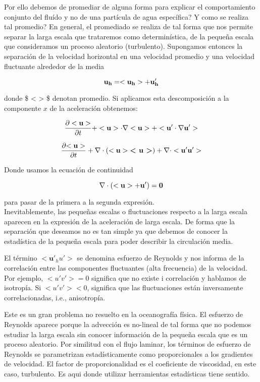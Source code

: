 \documentclass[
]{agujournal2019}
\begin{document}
Por ello debemos de promediar de alguna forma para explicar el
comportamiento conjunto del fluído y no de una partícula de agua
específica? Y como se realiza tal promedio? En general, el promediado se
realiza de tal forma que nos permite separar la larga escala que
trataremos como determinística, de la pequeña escala que consideramos un
proceso aleatorio (turbulento). Supongamos entonces la separación de la
velocidad horizontal en una velocidad promedio y una velocidad
fluctuante alrededor de la media

\[ \bf {u_h} = <\bf {u_h}> + \bf {u'_h} \]

donde \$ \textless{} \textgreater{} \$ denotan promedio. Si aplicamos
esta descomposición a la componente \(x\) de la aceleración obtenemos:

\[
\frac{\partial <\bf {u}>}{\partial t} +  <{\bf u}> \cdot  {\nabla} <{\bf u} >  + < {\bf u'} \cdot {\nabla} \bf {u}'> 
\]

\[
 \frac{\partial \bf {< u >}}{\partial t} + \nabla \cdot (<{\bf u}> \textbf {< u >}) + \nabla \cdot< \bf {u'} \bf {u}' >
\]

Donde usamos la ecuación de continuidad

\[ \nabla \cdot (< \bf {u} > + \bf {u}') =0 \]

para pasar de la primera a la segunda expresión.\\

Inevitablemente, las pequeñas escalas o fluctuaciones respecto a la
larga escala aparecen en la expresión de la aceleración de larga escala.
De forma que la separación que deseamos no es tan simple ya que debemos
de conocer la estadística de la pequeña escala para poder describir la
circulación media.

El término \(<\textbf {u}'_h u'>\) se denomina esfuerzo de Reynolds y
nos informa de la correlación entre las componentes fluctuantes (alta
frecuencia) de la velocidad. Por ejemplo, \(<u'v'> = 0\) significa que
no existe i correlación y hablamos de isotropía. Si \(<u'v'> < 0\),
significa que las fluctuaciones están inversamente correlacionadas,
i.e., anisotropía.

Este es un gran problema no resuelto en la oceanografía física. El
esfuerzo de Reynolds aparece porque la advección es no-lineal de tal
forma que no podemos estudiar la larga escala sin conocer información de
la pequeña escala que es un proceso aleatorio. Por similitud con el
flujo laminar, los términos de esfuerzo de Reynolds se parametrizan
estadísticamente como proporcionales a los gradientes de velocidad. El
factor de proporcionalidad es el coeficiente de viscosidad, en este
caso, turbulento. Es aqui donde utilizar herramientas estadísticas tiene
sentido.
\end{document}
